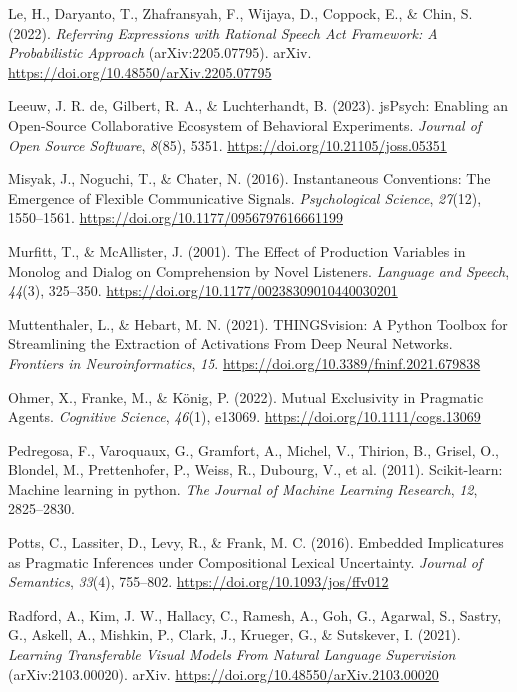 \documentclass[10pt, letterpaper]{article}
\begin{document}
\begin{CSLReferences}{1}{0}
Le, H., Daryanto, T., Zhafransyah, F., Wijaya, D., Coppock, E., \& Chin,
S. (2022). \emph{Referring {Expressions} with {Rational Speech Act
Framework}: {A Probabilistic Approach}} (arXiv:2205.07795). arXiv.
\url{https://doi.org/10.48550/arXiv.2205.07795}

Leeuw, J. R. de, Gilbert, R. A., \& Luchterhandt, B. (2023). {jsPsych}:
{Enabling} an {Open-Source Collaborative Ecosystem} of {Behavioral
Experiments}. \emph{Journal of Open Source Software}, \emph{8}(85),
5351. \url{https://doi.org/10.21105/joss.05351}

Misyak, J., Noguchi, T., \& Chater, N. (2016). Instantaneous
{Conventions}: {The Emergence} of {Flexible Communicative Signals}.
\emph{Psychological Science}, \emph{27}(12), 1550--1561.
\url{https://doi.org/10.1177/0956797616661199}

Murfitt, T., \& McAllister, J. (2001). The {Effect} of {Production
Variables} in {Monolog} and {Dialog} on {Comprehension} by {Novel
Listeners}. \emph{Language and Speech}, \emph{44}(3), 325--350.
\url{https://doi.org/10.1177/00238309010440030201}

Muttenthaler, L., \& Hebart, M. N. (2021). {THINGSvision}: {A Python
Toolbox} for {Streamlining} the {Extraction} of {Activations From Deep
Neural Networks}. \emph{Frontiers in Neuroinformatics}, \emph{15}.
\url{https://doi.org/10.3389/fninf.2021.679838}

Ohmer, X., Franke, M., \& König, P. (2022). Mutual {Exclusivity} in
{Pragmatic Agents}. \emph{Cognitive Science}, \emph{46}(1), e13069.
\url{https://doi.org/10.1111/cogs.13069}

Pedregosa, F., Varoquaux, G., Gramfort, A., Michel, V., Thirion, B.,
Grisel, O., Blondel, M., Prettenhofer, P., Weiss, R., Dubourg, V., et
al. (2011). Scikit-learn: {Machine} learning in python. \emph{The
Journal of Machine Learning Research}, \emph{12}, 2825--2830.

Potts, C., Lassiter, D., Levy, R., \& Frank, M. C. (2016). Embedded
{Implicatures} as {Pragmatic Inferences} under {Compositional Lexical
Uncertainty}. \emph{Journal of Semantics}, \emph{33}(4), 755--802.
\url{https://doi.org/10.1093/jos/ffv012}

Radford, A., Kim, J. W., Hallacy, C., Ramesh, A., Goh, G., Agarwal, S.,
Sastry, G., Askell, A., Mishkin, P., Clark, J., Krueger, G., \&
Sutskever, I. (2021). \emph{Learning {Transferable Visual Models From
Natural Language Supervision}} (arXiv:2103.00020). arXiv.
\url{https://doi.org/10.48550/arXiv.2103.00020}


\end{CSLReferences}
\end{document}
